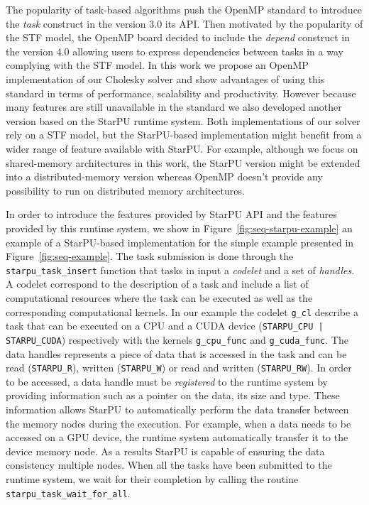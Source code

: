 \documentclass{article}
\begin{document}
The popularity of task-based algorithms push the OpenMP standard to
introduce the \textit{task} construct in the version 3.0 its API. Then
motivated by the popularity of the STF model, the OpenMP board decided
to include the \textit{depend} construct in the version 4.0 allowing
users to express dependencies between tasks in a way complying with
the STF model. In this work we propose an OpenMP implementation of our
Cholesky solver and show advantages of using this standard in terms of
performance, scalability and productivity. However because many
features are still unavailable in the standard we also developed
another version based on the StarPU runtime system. Both
implementations of our solver rely on a STF model, but the
StarPU-based implementation might benefit from a wider range of
feature available with StarPU. For example, although we focus on
shared-memory architectures in this work, the StarPU version might be
extended into a distributed-memory version whereas OpenMP doesn't
provide any possibility to run on distributed memory architectures.

In order to introduce the features provided by StarPU API and the
features provided by this runtime system, we show in
Figure~\ref{fig:seq-starpu-example} an example of a StarPU-based
implementation for the simple example presented in
Figure~\ref{fig:seq-example}. The task submission is done through the
\texttt{starpu\_task\_insert} function that tasks in input a
\textit{codelet} and a set of \textit{handles}. A codelet correspond
to the description of a task and include a list of computational
resources where the task can be executed as well as the corresponding
computational kernels. In our example the codelet \texttt{g\_cl}
describe a task that can be executed on a CPU and a CUDA device
(\texttt{STARPU\_CPU | STARPU\_CUDA}) respectively with the kernels
\texttt{g\_cpu\_func} and \texttt{g\_cuda\_func}. The data handles
represents a piece of data that is accessed in the task and can be
read (\texttt{STARPU\_R}), written (\texttt{STARPU\_W}) or read and
written (\texttt{STARPU\_RW}). In order to be accessed, a data handle
must be \textit{registered} to the runtime system by providing
information such as a pointer on the data, its size and type. These
information allows StarPU to automatically perform the data transfer
between the memory nodes during the execution. For example, when a
data needs to be accessed on a GPU device, the runtime system
automatically transfer it to the device memory node. As a results
StarPU is capable of ensuring the data consistency multiple
nodes. When all the tasks have been submitted to the runtime system,
we wait for their completion by calling the routine
\texttt{starpu\_task\_wait\_for\_all}.
\end{document}
